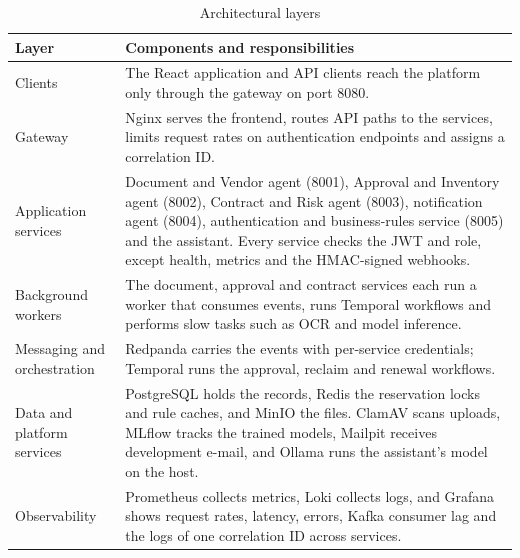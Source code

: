 \begin{table}[H]
\centering\tablestyle
\caption{Architectural layers}\label{tab:layers}
\begin{tabularx}{\textwidth}{|L{0.19\textwidth}|Y|}
\hline
\textbf{Layer} & \textbf{Components and responsibilities} \\ \hline
Clients & The React application and API clients reach the platform only through the gateway on port 8080. \\ \hline
Gateway & Nginx serves the frontend, routes API paths to the services, limits request rates on authentication endpoints and assigns a correlation ID. \\ \hline
Application services & Document and Vendor agent (8001), Approval and Inventory agent (8002), Contract and Risk agent (8003), notification agent (8004), authentication and business-rules service (8005) and the assistant. Every service checks the JWT and role, except health, metrics and the HMAC-signed webhooks. \\ \hline
Background workers & The document, approval and contract services each run a worker that consumes events, runs Temporal workflows and performs slow tasks such as OCR and model inference. \\ \hline
Messaging and orchestration & Redpanda carries the events with per-service credentials; Temporal runs the approval, reclaim and renewal workflows. \\ \hline
Data and platform services & PostgreSQL holds the records, Redis the reservation locks and rule caches, and MinIO the files. ClamAV scans uploads, MLflow tracks the trained models, Mailpit receives development e-mail, and Ollama runs the assistant's model on the host. \\ \hline
Observability & Prometheus collects metrics, Loki collects logs, and Grafana shows request rates, latency, errors, Kafka consumer lag and the logs of one correlation ID across services. \\ \hline
\end{tabularx}
\end{table}

